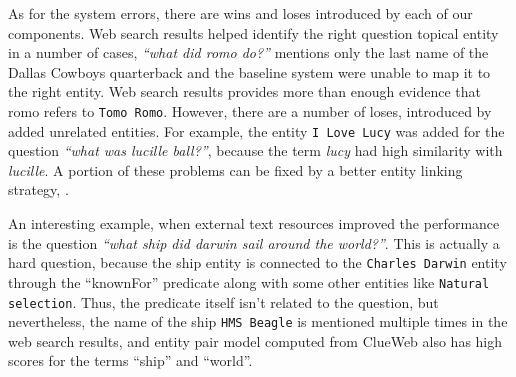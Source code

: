 
As for the system errors, there are wins and loses introduced by each of our components.
Web search results helped identify the right question topical entity in a number of cases, \eg \textit{``what did romo do?''} mentions only the last name of the Dallas Cowboys quarterback and the baseline system were unable to map it to the right entity.
Web search results provides more than enough evidence that romo refers to \texttt{Tomo Romo}.
However, there are a number of loses, introduced by added unrelated entities.
For example, the entity \texttt{I Love Lucy} was added for the question \textit{``what was lucille ball?''}, because the term \textit{lucy} had high similarity with \textit{lucille}.
A portion of these problems can be fixed by a better entity linking strategy, \eg \cite{SMAPH_ERD:2014}.


An interesting example, when external text resources improved the performance is the question \textit{``what ship did darwin sail around the world?''}.
This is actually a hard question, because the ship entity is connected to the \texttt{Charles Darwin} entity through the ``knownFor'' predicate along with some other entities like \texttt{Natural selection}.
Thus, the predicate itself isn't related to the question, but nevertheless, the name of the ship \texttt{HMS Beagle} is mentioned multiple times in the web search results, and entity pair model computed from ClueWeb also has high scores for the terms ``ship'' and ``world''.

